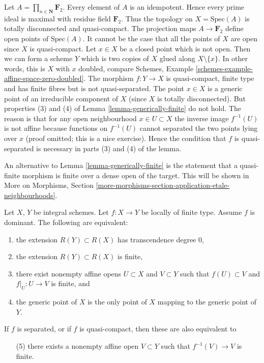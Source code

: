 \begin{example}
\label{example-counter-generically-finite}
Let $A = \prod_{n \in \mathbf{N}} \mathbf{F}_2$.
Every element of $A$ is an idempotent. Hence every prime ideal is maximal
with residue field $\mathbf{F}_2$.
Thus the topology on $X = \text{Spec}(A)$ is totally disconnected
and quasi-compact. The projection maps $A \to \mathbf{F}_2$ define open
points of $\text{Spec}(A)$. It cannot be the case that all the points
of $X$ are open since $X$ is quasi-compact. Let $x \in X$ be a closed
point which is not open. Then we can form a scheme $Y$ which is two
copies of $X$ glued along $X \setminus \{x\}$. In other words, this
is $X$ with $x$ doubled, compare
Schemes, Example \ref{schemes-example-affine-space-zero-doubled}.
The morphism
$f : Y \to X$ is quasi-compact, finite type and has finite fibres
but is not quasi-separated.
The point $x \in X$ is a generic point of an irreducible component
of $X$ (since $X$ is totally disconnected). But properties (3) and (4)
of Lemma \ref{lemma-generically-finite} do not hold. The reason is that
for any open neighbourhood $x \in U \subset X$ the inverse image
$f^{-1}(U)$ is not affine because functions on $f^{-1}(U)$ cannot
separated the two points lying over $x$ (proof omitted; this is a
nice exercise). Hence the condition that $f$ is quasi-separated is
necessary in parts (3) and (4) of the lemma.
\end{example}

\begin{remark}
\label{remark-quasi-finite-finite-over-dense-open}
An alternative to
Lemma \ref{lemma-generically-finite}
is the statement that a quasi-finite morphism is finite
over a dense open of the target. This will be shown in
More on Morphisms,
Section \ref{more-morphisms-section-application-etale-neighbourhoods}.
\end{remark}

\begin{lemma}
\label{lemma-finite-degree}
Let $X$, $Y$ be integral schemes.
Let $f : X \to Y$ be locally of finite type.
Assume $f$ is dominant.
The following are equivalent:
\begin{enumerate}
\item the extension $R(Y) \subset R(X)$ has
transcendence degree $0$,
\item the extension $R(Y) \subset R(X)$ is finite,
\item there exist nonempty affine opens $U \subset X$
and $V \subset Y$ such that $f(U) \subset V$
and $f|_U : U \to V$ is finite, and
\item the generic point of $X$ is the only point of $X$ mapping to
the generic point of $Y$.
\end{enumerate}
If $f$ is separated, or if $f$ is quasi-compact, then these are
also equivalent to
\begin{enumerate}
\item[(5)] there exists a nonempty affine open $V \subset Y$ such
that $f^{-1}(V) \to V$ is finite.
\end{enumerate}
\end{lemma}

